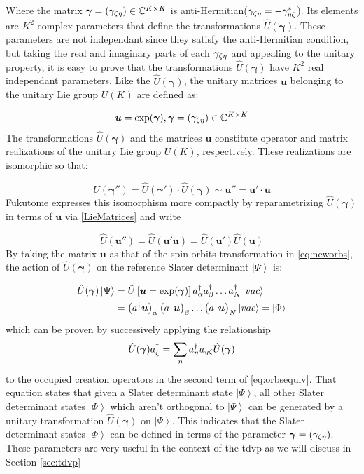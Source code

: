 \documentclass{aux/ttuthes2007}
\newcommand{\ket}[1]{\ensuremath{\left|#1\right\rangle}}
\newcommand{\paren}[1]{\left( #1 \right)}
\newcommand{\elec}{N}
\newcommand{\orb}{K}
\newcommand{\creo}[1]{a^\dagger_{\oo{#1}}}
\newcommand{\creg}[1]{a^\dagger_{\go{#1}}}
\newcommand{\vac}{\ket{vac}}
\newcommand{\oo}[1]{
		\IfEqCase{#1}{
			{0}{\alpha}
			{1}{\beta}
			{2}{\gamma}
		}[\PackageError{unocorb}{Undefined option to unuo: #1}{}]
}
\newcommand{\go}[1]{
		\IfEqCase{#1}{
			{0}{\zeta}
			{1}{\eta}
			{2}{\iota}
			{3}{\kappa}
		}[\PackageError{unocorb}{Undefined option to go: #1}{}]
}
\begin{document}
Where the matrix $\bm \gamma = \paren{\gamma_{\go 0 \go 1}} \in \mathbb{C}^{\orb\times\orb}$ is anti-Hermitian($\gamma_{\go 0 \go 1} = -\gamma_{\go 1 \go 0}^*$).
Its elements are $\orb^2$ complex parameters that define the transformations $\hat U(\bm \gamma)$.
These parameters are not independant since they satisfy the anti-Hermitian condition, but taking the real and imaginary parts of each $\gamma_{\go 0 \go 1}$ and appealing to the unitary property, it is easy to prove that the transformations $\hat U(\bm \gamma)$ have $\orb^2$ real independant parameters.
Like the $\hat U(\bm \gamma)$, the unitary matrices $\bm u$ belonging to the unitary Lie group $U(\orb)$ are defined as:

\begin{equation}\label{LieMatrices}
	\bm u = \exp(\bm \gamma), \bm\gamma = (\gamma_{\go 0 \go 1}) \in \mathbb{C}^{\orb\times\orb}
\end{equation}
The transformations $\hat U(\bm \gamma)$ and the matrices $\bm u$ constitute operator and matrix realizations of the unitary Lie group $U(\orb)$, respectively. These realizations are isomorphic so that:

\[
	\hat U(\bm{\gamma''}) = \hat U(\bm{\gamma'}) \cdot \hat U(\bm{\gamma}) \sim \bm{u''} = \bm{u'} \cdot \bm u
\]
Fukutome expresses this isomorphism more compactly by reparametrizing $\hat U(\bm \gamma)$ in terms of $\bm u$ via \ref{LieMatrices} and write

\[
	\hat U(\bm{u''}) = \hat U(\bm{u'u}) 
	= \hat U(\bm{u'}) \hat U (\bm{u}) 
\]
By taking the matrix $\bm u$ as that of the spin-orbits transformation in \ref{eq:neworbs}, the action of $\hat U(\bm \gamma)$ on the reference Slater determinant $\ket \Psi$ is:

\begin{equation}\label{eq:orbsequiv}
\begin{split}
	\hat U(\bm \gamma)\ket\Psi
	&= \hat U \left[\bm u = \exp(\bm \gamma) \right] \creo 0 \creo 1 \ldots a_\elec^\dagger\vac\\
	&= \paren{a^\dagger \bm u}_{\oo 0} 
	\paren{a^\dagger \bm u}_{\oo 1} \ldots 
	\paren{a^\dagger \bm u}_\elec \vac
	= \ket\Phi
\end{split}
\end{equation}
which can be proven by successively applying the relationship 
\[
	{\hat U(\bm \gamma) \creg 0  = \sum_{\go 1} \creg 1 u_{\go 1 \go 0} \hat U(\bm \gamma)}
\]
to the occupied creation operators in the second term of \ref{eq:orbsequiv}. That equation states that given a Slater determinant state $\ket\Psi$, all other Slater determinant states $\ket\Phi$ which aren't orthogonal to $\ket \Psi$ can be generated by a unitary transformation $\hat U(\bm \gamma)$ on $\ket\Psi$. This indicates that the Slater determinant states $\ket\Phi$ can be defined in terms of the parameter $\bm \gamma = \paren{\gamma_{\go 0 \go 1}}$. These parameters are very useful in the context of the \gls{tdvp} as we will discuss in Section \ref{sec:tdvp}
\end{document}
